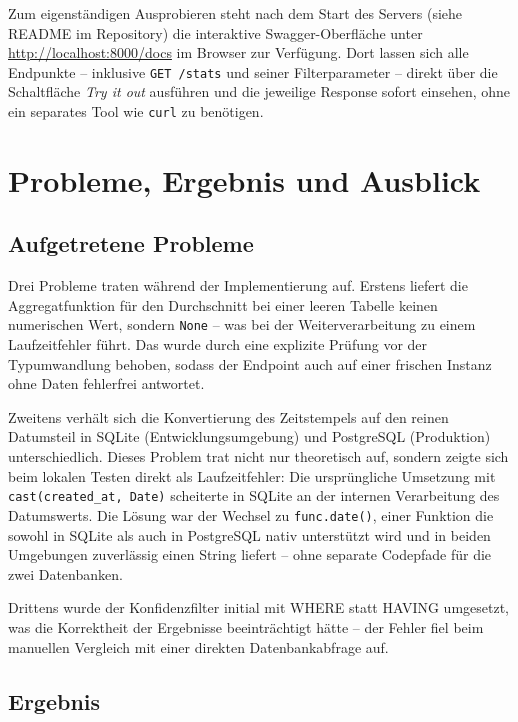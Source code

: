 \documentclass[12pt, a4paper]{article}
\begin{document}
Zum eigenständigen Ausprobieren steht nach dem Start des Servers (siehe
README im Repository) die interaktive Swagger-Oberfläche unter
\url{http://localhost:8000/docs} im Browser zur Verfügung. Dort lassen sich
alle Endpunkte -- inklusive \texttt{GET /stats} und seiner Filterparameter
-- direkt über die Schaltfläche \textit{Try it out} ausführen und die
jeweilige Response sofort einsehen, ohne ein separates Tool wie \texttt{curl}
zu benötigen.

\section{Probleme, Ergebnis und Ausblick}

\subsection{Aufgetretene Probleme}

Drei Probleme traten während der Implementierung auf. Erstens liefert die
Aggregatfunktion für den Durchschnitt bei einer leeren Tabelle keinen
numerischen Wert, sondern \texttt{None} -- was bei der Weiterverarbeitung
zu einem Laufzeitfehler führt. Das wurde durch eine explizite Prüfung
vor der Typumwandlung behoben, sodass der Endpoint auch auf einer frischen
Instanz ohne Daten fehlerfrei antwortet.

Zweitens verhält sich die Konvertierung des Zeitstempels auf den reinen
Datumsteil in SQLite (Entwicklungsumgebung) und PostgreSQL (Produktion)
unterschiedlich. Dieses Problem trat nicht nur theoretisch auf, sondern
zeigte sich beim lokalen Testen direkt als Laufzeitfehler: Die ursprüngliche
Umsetzung mit \texttt{cast(created\_at, Date)} scheiterte in SQLite an der
internen Verarbeitung des Datumswerts. Die Lösung war der Wechsel zu
\texttt{func.date()}, einer Funktion die sowohl in SQLite als auch in
PostgreSQL nativ unterstützt wird und in beiden Umgebungen zuverlässig
einen String liefert -- ohne separate Codepfade für die zwei Datenbanken.

Drittens wurde der Konfidenzfilter initial mit WHERE statt HAVING umgesetzt, was die Korrektheit der Ergebnisse beeinträchtigt hätte -- der Fehler fiel beim manuellen Vergleich mit einer direkten Datenbankabfrage auf.

\subsection{Ergebnis}
\end{document}
